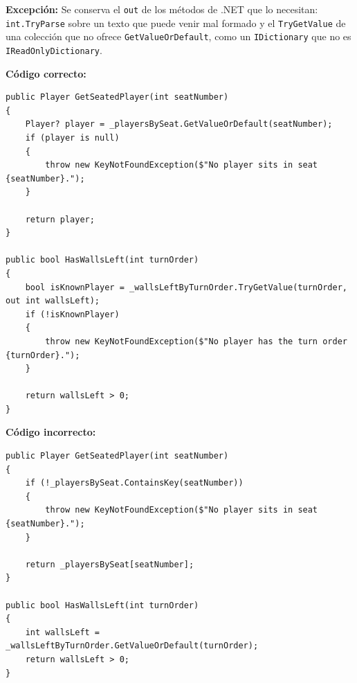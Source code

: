 \textbf{Excepción:} Se conserva el \texttt{out} de los métodos de .NET que lo necesitan: \texttt{int.TryParse} sobre un texto que puede venir mal formado y el \texttt{TryGetValue} de una colección que no ofrece \texttt{GetValueOrDefault}, como un \texttt{IDictionary} que no es \texttt{IReadOnlyDictionary}.

\textbf{Código correcto:}
\begin{lstlisting}[style=csharpstyle,basicstyle=\ttfamily\scriptsize]
public Player GetSeatedPlayer(int seatNumber)
{
    Player? player = _playersBySeat.GetValueOrDefault(seatNumber);
    if (player is null)
    {
        throw new KeyNotFoundException($"No player sits in seat {seatNumber}.");
    }

    return player;
}

public bool HasWallsLeft(int turnOrder)
{
    bool isKnownPlayer = _wallsLeftByTurnOrder.TryGetValue(turnOrder, out int wallsLeft);
    if (!isKnownPlayer)
    {
        throw new KeyNotFoundException($"No player has the turn order {turnOrder}.");
    }

    return wallsLeft > 0;
}
\end{lstlisting}

\textbf{Código incorrecto:}
\begin{lstlisting}[style=csharpstyle,basicstyle=\ttfamily\scriptsize]
public Player GetSeatedPlayer(int seatNumber)
{
    if (!_playersBySeat.ContainsKey(seatNumber))
    {
        throw new KeyNotFoundException($"No player sits in seat {seatNumber}.");
    }

    return _playersBySeat[seatNumber];
}

public bool HasWallsLeft(int turnOrder)
{
    int wallsLeft = _wallsLeftByTurnOrder.GetValueOrDefault(turnOrder);
    return wallsLeft > 0;
}
\end{lstlisting}
